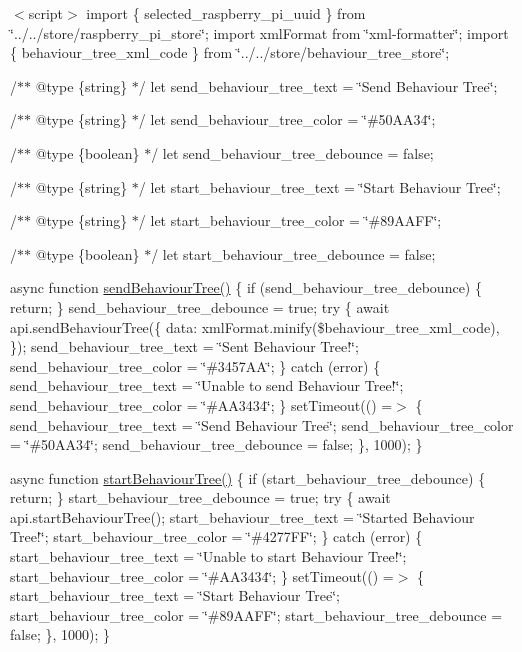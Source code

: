 $<$script$>$ import \{ selected\+\_\+raspberry\+\_\+pi\+\_\+uuid \} from \char`\"{}../../store/raspberry\+\_\+pi\+\_\+store\char`\"{}; import xml\+Format from \char`\"{}xml-\/formatter\char`\"{}; import \{ behaviour\+\_\+tree\+\_\+xml\+\_\+code \} from \char`\"{}../../store/behaviour\+\_\+tree\+\_\+store\char`\"{};

/$\ast$$\ast$ @type \{string\} $\ast$/ let send\+\_\+behaviour\+\_\+tree\+\_\+text = \char`\"{}\+Send Behaviour Tree\char`\"{};

/$\ast$$\ast$ @type \{string\} $\ast$/ let send\+\_\+behaviour\+\_\+tree\+\_\+color = \char`\"{}\#50\+AA34\char`\"{};

/$\ast$$\ast$ @type \{boolean\} $\ast$/ let send\+\_\+behaviour\+\_\+tree\+\_\+debounce = false;

/$\ast$$\ast$ @type \{string\} $\ast$/ let start\+\_\+behaviour\+\_\+tree\+\_\+text = \char`\"{}\+Start Behaviour Tree\char`\"{};

/$\ast$$\ast$ @type \{string\} $\ast$/ let start\+\_\+behaviour\+\_\+tree\+\_\+color = \char`\"{}\#89\+AAFF\char`\"{};

/$\ast$$\ast$ @type \{boolean\} $\ast$/ let start\+\_\+behaviour\+\_\+tree\+\_\+debounce = false;

async function \mbox{\hyperlink{behaviour__tree_8js_a0877b082bd308be13518093717c4bd45}{send\+Behaviour\+Tree()}} \{ if (send\+\_\+behaviour\+\_\+tree\+\_\+debounce) \{ return; \} send\+\_\+behaviour\+\_\+tree\+\_\+debounce = true; try \{ await api.\+send\+Behaviour\+Tree(\{ data\+: xml\+Format.\+minify(\$behaviour\+\_\+tree\+\_\+xml\+\_\+code), \}); send\+\_\+behaviour\+\_\+tree\+\_\+text = \char`\"{}\+Sent Behaviour Tree!\char`\"{}; send\+\_\+behaviour\+\_\+tree\+\_\+color = \char`\"{}\#3457\+AA\char`\"{}; \} catch (error) \{ send\+\_\+behaviour\+\_\+tree\+\_\+text = \char`\"{}\+Unable to send Behaviour Tree!\char`\"{}; send\+\_\+behaviour\+\_\+tree\+\_\+color = \char`\"{}\#\+AA3434\char`\"{}; \} set\+Timeout(() =\texorpdfstring{$>$}{>} \{ send\+\_\+behaviour\+\_\+tree\+\_\+text = \char`\"{}\+Send Behaviour Tree\char`\"{}; send\+\_\+behaviour\+\_\+tree\+\_\+color = \char`\"{}\#50\+AA34\char`\"{}; send\+\_\+behaviour\+\_\+tree\+\_\+debounce = false; \}, 1000); \}

async function \mbox{\hyperlink{behaviour__tree_8js_aac2c0c00fc0702be14d2e88e51016c2e}{start\+Behaviour\+Tree()}} \{ if (start\+\_\+behaviour\+\_\+tree\+\_\+debounce) \{ return; \} start\+\_\+behaviour\+\_\+tree\+\_\+debounce = true; try \{ await api.\+start\+Behaviour\+Tree(); start\+\_\+behaviour\+\_\+tree\+\_\+text = \char`\"{}\+Started Behaviour Tree!\char`\"{}; start\+\_\+behaviour\+\_\+tree\+\_\+color = \char`\"{}\#4277\+FF\char`\"{}; \} catch (error) \{ start\+\_\+behaviour\+\_\+tree\+\_\+text = \char`\"{}\+Unable to start Behaviour Tree!\char`\"{}; start\+\_\+behaviour\+\_\+tree\+\_\+color = \char`\"{}\#\+AA3434\char`\"{}; \} set\+Timeout(() =\texorpdfstring{$>$}{>} \{ start\+\_\+behaviour\+\_\+tree\+\_\+text = \char`\"{}\+Start Behaviour Tree\char`\"{}; start\+\_\+behaviour\+\_\+tree\+\_\+color = \char`\"{}\#89\+AAFF\char`\"{}; start\+\_\+behaviour\+\_\+tree\+\_\+debounce = false; \}, 1000); \}

